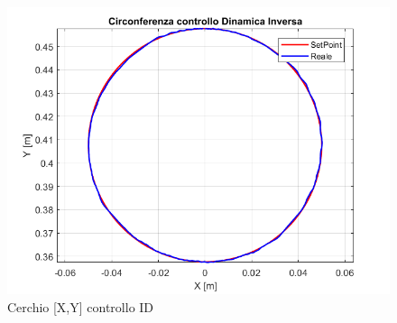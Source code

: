 \begin{figure}[ht]
	\begin{center}
		\includegraphics[scale=0.6]{Immagini/Traiettorie/CerchioDinamicaInversa}
		\caption{Cerchio [X,Y] controllo ID}
		\label{fig:IDbracciaC}
	\end{center}
\end{figure}

